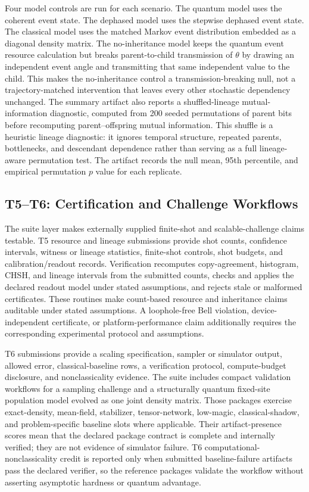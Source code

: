 \documentclass[11pt]{article}
\begin{document}
Four model controls are run for each scenario. The quantum model uses the coherent event state. The dephased model uses the stepwise dephased event state. The classical model uses the matched Markov event distribution embedded as a diagonal density matrix. The no-inheritance model keeps the quantum event resource calculation but breaks parent-to-child transmission of $\theta$ by drawing an independent event angle and transmitting that same independent value to the child. This makes the no-inheritance control a transmission-breaking null, not a trajectory-matched intervention that leaves every other stochastic dependency unchanged. The summary artifact also reports a shuffled-lineage mutual-information diagnostic, computed from 200 seeded permutations of parent bits before recomputing parent--offspring mutual information. This shuffle is a heuristic lineage diagnostic: it ignores temporal structure, repeated parents, bottlenecks, and descendant dependence rather than serving as a full lineage-aware permutation test. The artifact records the null mean, 95th percentile, and empirical permutation $p$ value for each replicate.

\subsection{T5--T6: Certification and Challenge Workflows}

The suite layer makes externally supplied finite-shot and scalable-challenge claims testable. T5 resource and lineage submissions provide shot counts, confidence intervals, witness or lineage statistics, finite-shot controls, shot budgets, and calibration/readout records. Verification recomputes copy-agreement, histogram, CHSH, and lineage intervals from the submitted counts, checks and applies the declared readout model under stated assumptions, and rejects stale or malformed certificates. These routines make count-based resource and inheritance claims auditable under stated assumptions. A loophole-free Bell violation, device-independent certificate, or platform-performance claim additionally requires the corresponding experimental protocol and assumptions.

T6 submissions provide a scaling specification, sampler or simulator output, allowed error, classical-baseline rows, a verification protocol, compute-budget disclosure, and nonclassicality evidence. The suite includes compact validation workflows for a sampling challenge and a structurally quantum fixed-site population model evolved as one joint density matrix. Those packages exercise exact-density, mean-field, stabilizer, tensor-network, low-magic, classical-shadow, and problem-specific baseline slots where applicable. Their artifact-presence scores mean that the declared package contract is complete and internally verified; they are not evidence of simulator failure. T6 computational-nonclassicality credit is reported only when submitted baseline-failure artifacts pass the declared verifier, so the reference packages validate the workflow without asserting asymptotic hardness or quantum advantage.
\end{document}
